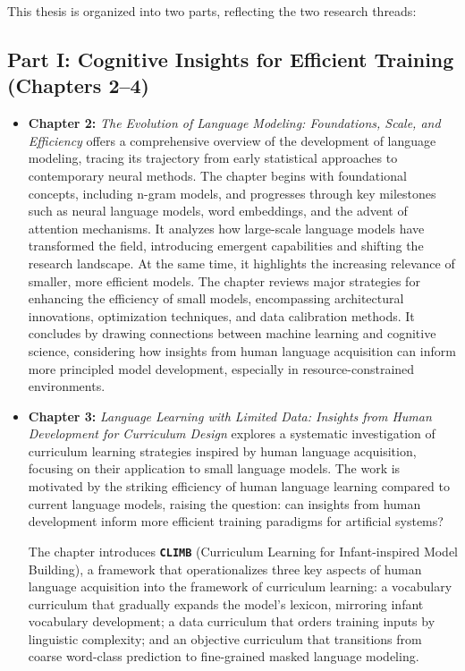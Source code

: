 This thesis is organized into two parts, reflecting the two research threads:

\subsection*{Part I: Cognitive Insights for Efficient Training (Chapters 2–4)}

\begin{itemize}

    \item \textbf{Chapter 2:} \emph{The Evolution of Language Modeling: Foundations, Scale, and Efficiency} offers a comprehensive overview of the development of language modeling, tracing its trajectory from early statistical approaches to contemporary neural methods. The chapter begins with foundational concepts, including n-gram models, and progresses through key milestones such as neural language models, word embeddings, and the advent of attention mechanisms. It analyzes how large-scale language models have transformed the field, introducing emergent capabilities and shifting the research landscape. At the same time, it highlights the increasing relevance of smaller, more efficient models. The chapter reviews major strategies for enhancing the efficiency of small models, encompassing architectural innovations, optimization techniques, and data calibration methods. It concludes by drawing connections between machine learning and cognitive science, considering how insights from human language acquisition can inform more principled model development, especially in resource-constrained environments.


    \item \textbf{Chapter 3:} \emph{Language Learning with Limited Data: Insights from Human Development for Curriculum Design}  
    explores a systematic investigation of curriculum learning strategies inspired by human language acquisition, focusing on their application to small language models. The work is motivated by the striking efficiency of human language learning compared to current language models, raising the question: can insights from human development inform more efficient training paradigms for artificial systems?

    The chapter introduces \textbf{\texttt{CLIMB}} (Curriculum Learning for Infant-inspired Model Building), a framework that operationalizes three key aspects of human language acquisition into the framework of curriculum learning: a vocabulary curriculum that gradually expands the model's lexicon, mirroring infant vocabulary development; a data curriculum that orders training inputs by linguistic complexity; and an objective curriculum that transitions from coarse word-class prediction to fine-grained masked language modeling.


\end{itemize}
